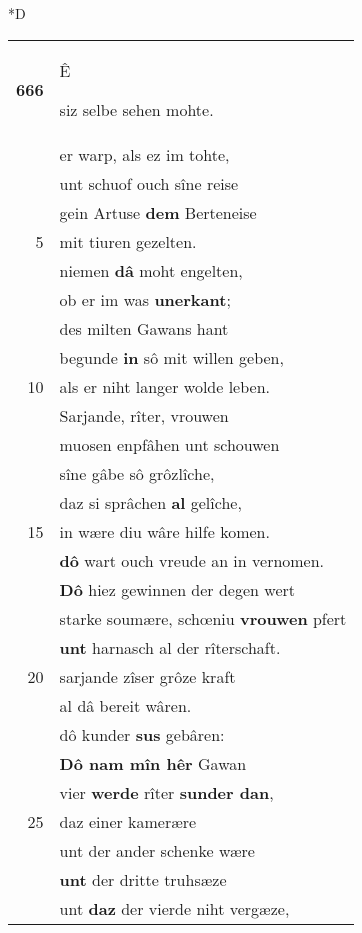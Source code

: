 \documentclass[8pt,a4paper,notitlepage]{article}
\begin{document}
\begin{table}[ht]
\begin{minipage}[t]{0.5\linewidth}
\small
\begin{center}*D
\end{center}
\begin{tabular}{rl}
\textbf{666} & \begin{large}Ê\end{large} siz selbe sehen mohte.\\ 
 & er warp, als ez im tohte,\\ 
 & unt schuof ouch sîne reise\\ 
 & gein Artuse \textbf{dem} Berteneise\\ 
5 & mit tiuren gezelten.\\ 
 & niemen \textbf{dâ} moht engelten,\\ 
 & ob er im was \textbf{unerkant};\\ 
 & des milten Gawans hant\\ 
 & begunde \textbf{in} sô mit willen geben,\\ 
10 & als er niht langer wolde leben.\\ 
 & Sarjande, rîter, vrouwen\\ 
 & muosen enpfâhen unt schouwen\\ 
 & sîne gâbe sô grôzlîche,\\ 
 & daz si sprâchen \textbf{al} gelîche,\\ 
15 & in wære diu wâre hilfe komen.\\ 
 & \textbf{dô} wart ouch vreude an in vernomen.\\ 
 & \textbf{Dô} hiez gewinnen der degen wert\\ 
 & starke soumære, schœniu \textbf{vrouwen} pfert\\ 
 & \textbf{unt} harnasch al der rîterschaft.\\ 
20 & sarjande zîser grôze kraft\\ 
 & al dâ bereit wâren.\\ 
 & dô kunder \textbf{sus} gebâren:\\ 
 & \textbf{Dô nam mîn hêr} Gawan\\ 
 & vier \textbf{werde} rîter \textbf{sunder dan},\\ 
25 & daz einer kamerære\\ 
 & unt der ander schenke wære\\ 
 & \textbf{unt} der dritte truhsæze\\ 
 & unt \textbf{daz} der vierde niht vergæze,\\ 

\end{tabular}
\end{minipage}
\end{table}
\end{document}
